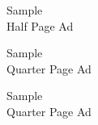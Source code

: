 \documentclass[12pt, a5paper, oneside]{article}
\begin{document}
\pagebreak
\begin{minipage}[c][0.5\textheight]{\linewidth}
\centering
    \Large Sample \\ Half Page Ad
\end{minipage}
\begin{minipage}[c][0.5\textheight]{0.5\linewidth}
\centering
    \Large Sample \\Quarter Page Ad
\end{minipage}
\begin{minipage}[c][0.5\textheight]{0.5\linewidth}
\centering
    \Large Sample \\Quarter Page Ad
\end{minipage}
\end{document}
